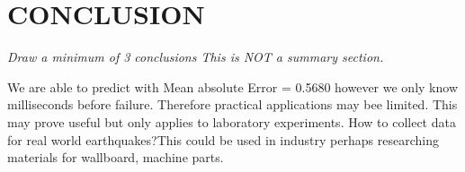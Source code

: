 \documentclass[]{llncs}
\begin{document}
\section{CONCLUSION}
{\em Draw a minimum of 3 conclusions  This is NOT a summary section.} 
\par

We are able to predict with Mean absolute Error = 0.5680 however we  only know milliseconds before failure. Therefore practical applications may bee limited. This may prove useful but only applies to laboratory experiments. How to collect data for real world earthquakes?This could be used in industry perhaps researching materials for wallboard, machine parts.
\par



\end{document}
